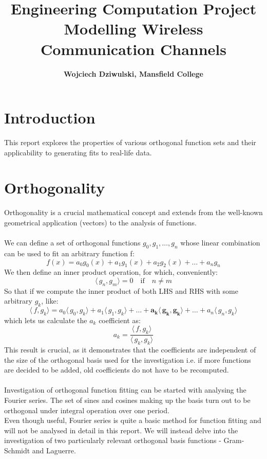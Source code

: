 \documentclass[a4paper, fleqn]{article}
\title{Engineering Computation Project \\ \large Modelling Wireless Communication Channels}
\author{\textbf{Wojciech Dziwulski, Mansfield College}}
\date{}
\numberwithin{equation}{section}
\begin{document}
\maketitle

\section{Introduction}

This report explores the properties of various orthogonal function sets and their applicability to generating fits to real-life data.

\section{Orthogonality}

Orthogonality is a crucial mathematical concept and extends from the well-known geometrical application (vectors) to the analysis of functions.
\\ \\
We can define a set of orthogonal functions $g_0, g_1, \ldots, g_n$ whose linear combination can be used to fit an arbitrary function f:
\begin{equation}f(x) = a_0 g_0(x)+a_1 g_1(x)+a_2 g_2(x)+\ldots+a_n g_n \end{equation}
\noindent We then define an inner product operation, for which, conveniently:
\begin{equation} \langle\,g_n,g_m\rangle = 0 \quad \textrm{if} \quad n \ne m \end{equation}
So that if we compute the inner product of both LHS and RHS with some arbitrary $g_k$, like:
\begin{equation} \langle\,f,g_k\rangle = a_0\langle\,g_0,g_k\rangle + a_1\langle\,g_1,g_k\rangle + \ldots + \boldsymbol{a_k\langle\,g_k,g_k\rangle} + \ldots + a_n\langle\,g_n,g_k\rangle \end{equation}
which lets us calculate the $a_k$ coefficient as:
\begin{equation} a_k = \frac {\langle\,f,g_k\rangle} {\langle\,g_k,g_k\rangle} \end{equation}
This result is crucial, as it demonstrates that the coefficients are independent of the size of the orthogonal basis used for the investigation i.e. if more functions are decided to be added, old coefficients do not have to be recomputed.
\\ \\
Investigation of orthogonal function fitting can be started with analysing the Fourier series. The set of sines and cosines making up the basis turn out to be orthogonal under integral operation over one period.
\\
Even though useful, Fourier series is quite a basic method for function fitting and will not be analysed in detail in this report. We will instead delve into the investigation of two particularly relevant orthogonal basis functions - Gram-Schmidt and Laguerre.
\end{document}
